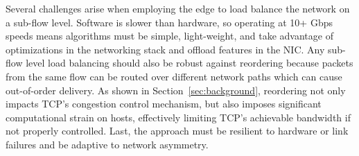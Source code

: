 


%
%
%

Several challenges arise when employing the edge to load balance the network
on a sub-flow level. Software is slower than hardware, so operating at 10+ Gbps speeds means
algorithms must be simple, light-weight, and take advantage of optimizations in
the networking stack and offload features in the NIC. Any sub-flow level load balancing should also be 
robust against reordering because packets from the same flow can be routed over different network paths which can cause out-of-order delivery.
As shown in Section~\ref{sec:background}, 
reordering not only impacts TCP's congestion control mechanism, but also imposes significant computational
strain on hosts, effectively limiting TCP's achievable bandwidth if not properly controlled. Last, the approach must be 
resilient to hardware or link failures and be adaptive to network asymmetry.



